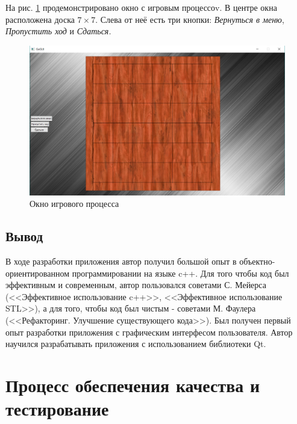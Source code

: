 На рис. \ref{pic:GUI_board} продемонстрировано окно с игровым процессоv. В центре окна расположена доска $7 \times 7$. Слева от неё есть три кнопки: \textit{Вернуться в меню}, \textit{Пропустить ход} и \textit{Сдаться.}

\begin{figure}[H]
	\begin{center}
		\includegraphics[scale=0.5]{pics/GoGUI/board.png}
	    \caption{Окно игрового процесса } 
		\label{pic:GUI_board}
	\end{center}
\end{figure}

\subsection*{Вывод}

В ходе разработки приложения автор получил большой опыт в объектно-ориентированном программировании на языке c++. Для того чтобы код был эффективным и современным, автор пользовался советами С. Мейерса (<<Эффективное использование c++>>, <<Эффективное использование STL>>), а для того, чтобы код был чистым - советами М. Фаулера (<<Рефакторинг. Улучшение существующего кода>>). Был получен первый опыт разработки приложения с графическим интерфесом пользователя. Автор научился разрабатывать приложения с использованием библиотеки Qt.

\section*{Процесс обеспечения качества и тестирование}


